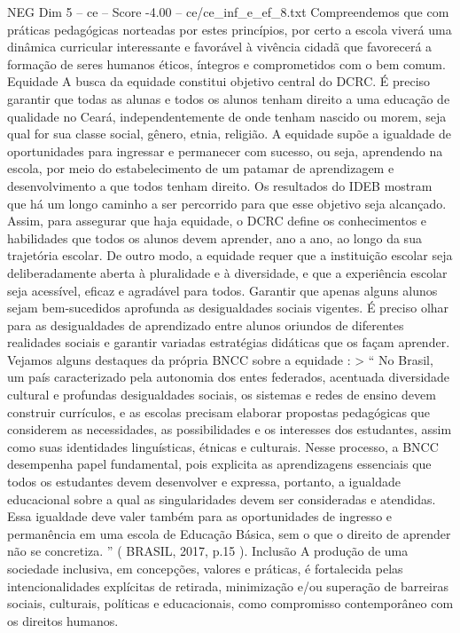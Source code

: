 \begin{textsample}{NEG Dim 5 – ce – Score -4.00 – ce/ce\_inf\_e\_ef\_8.txt}
Compreendemos que com práticas pedagógicas norteadas por estes princípios, por certo a escola viverá uma dinâmica curricular interessante e favorável à vivência cidadã que favorecerá a formação de seres humanos éticos, íntegros e comprometidos com o bem comum.
Equidade A busca da equidade constitui objetivo central do DCRC.
É preciso garantir que todas as alunas e todos os alunos tenham direito a uma educação de qualidade no Ceará, independentemente de onde tenham nascido ou morem, seja qual for sua classe social, gênero, etnia, religião.
A equidade supõe a igualdade de oportunidades para ingressar e permanecer com sucesso, ou seja, aprendendo na escola, por meio do estabelecimento de um patamar de aprendizagem e desenvolvimento a que todos tenham direito.
Os resultados do IDEB mostram que há um longo caminho a ser percorrido para que esse objetivo seja alcançado.
Assim, para assegurar que haja equidade, o DCRC define os conhecimentos e habilidades que todos os alunos devem aprender, ano a ano, ao longo da sua trajetória escolar.
De outro modo, a equidade requer que a instituição escolar seja deliberadamente aberta à pluralidade e à diversidade, e que a experiência escolar seja acessível, eficaz e agradável para todos.
Garantir que apenas alguns alunos sejam bem-sucedidos aprofunda as desigualdades sociais vigentes.
É preciso olhar para as desigualdades de aprendizado entre alunos oriundos de diferentes realidades sociais e garantir variadas estratégias didáticas que os façam aprender.
Vejamos alguns destaques da própria BNCC sobre a equidade : > “ No Brasil, um país caracterizado pela autonomia dos entes federados, acentuada diversidade cultural e profundas desigualdades sociais, os sistemas e redes de ensino devem construir currículos, e as escolas precisam elaborar propostas pedagógicas que considerem as necessidades, as possibilidades e os interesses dos estudantes, assim como suas identidades linguísticas, étnicas e culturais.
Nesse processo, a BNCC desempenha papel fundamental, pois explicita as aprendizagens essenciais que todos os estudantes devem desenvolver e expressa, portanto, a igualdade educacional sobre a qual as singularidades devem ser consideradas e atendidas.
Essa igualdade deve valer também para as oportunidades de ingresso e permanência em uma escola de Educação Básica, sem o que o direito de aprender não se concretiza. ” ( BRASIL, 2017, p.15 ).
Inclusão A produção de uma sociedade inclusiva, em concepções, valores e práticas, é fortalecida pelas intencionalidades explícitas de retirada, minimização e/ou superação de barreiras sociais, culturais, políticas e educacionais, como compromisso contemporâneo com os direitos humanos.

\end{textsample}

